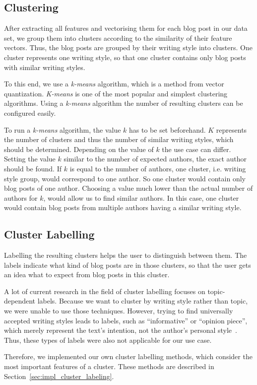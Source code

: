 
\subsection{Clustering}
\label{sec:clustering}

After extracting all features and vectorising them for each blog post in our data set, we group them into clusters according to the similarity of their feature vectors.
Thus, the blog posts are grouped by their writing style into clusters.
One cluster represents one writing style, so that one cluster contains only blog posts with similar writing styles.


To this end, we use a \textit{k-means} algorithm, which is a method from vector quantization.
\textit{K-means} is one of the most popular and simplest clustering algorithms.
Using a \textit{k-means} algorithm the number of resulting clusters can be configured easily.


To run a \textit{k-means} algorithm, the value $k$ has to be set beforehand.
$K$ represents the number of clusters and thus the number of similar writing styles, which should be determined.
Depending on the value of $k$ the use case can differ.
Setting the value $k$ similar to the number of expected authors, the exact author should be found.
If $k$ is equal to the number of authors, one cluster, i.e. writing style group, would correspond to one author.
So one cluster would contain only blog posts of one author.
Choosing a value much lower than the actual number of authors for $k$, would allow us to find similar authors.
In this case, one cluster would contain blog posts from multiple authors having a similar writing style.



\subsection{Cluster Labelling}
\label{sec:cluster_labeling}

Labelling the resulting clusters helps the user to distinguish between them.
The labels indicate what kind of blog posts are in those clusters, so that the user gets an idea what to expect from blog posts in this cluster.


A lot of current research in the field of cluster labelling focuses on topic-dependent labels.
Because we want to cluster by writing style rather than topic, we were unable to use those techniques.
However, trying to find universally accepted writing styles leads to labels, such as ``informative'' or ``opinion piece'', which merely represent the text's intention, not the author's personal style~\cite{lee2001genres}.
Thus, these types of labels were also not applicable for our use case.


Therefore, we implemented our own cluster labelling methods, which consider the most important features of a cluster.
These methods are described in Section~\ref{sec:impl_cluster_labeling}.